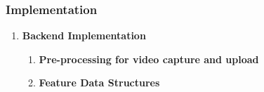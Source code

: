 \documentclass[12pt]{article}
\begin{document}
\subsubsection{Implementation}
\begin{enumerate}

      \item \textbf{Backend Implementation}
            \begin{enumerate}
                  \item \textbf{Pre-processing for video capture and upload}

                  \item \textbf{Feature Data Structures}


\end{enumerate}
\end{enumerate}
\end{document}
